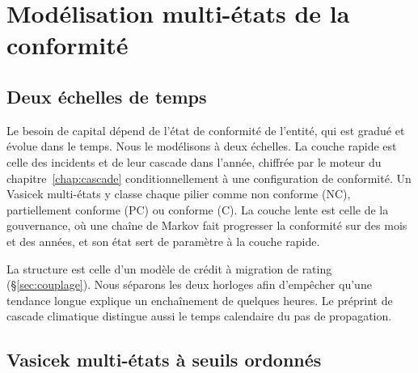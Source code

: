 
\chapter{Modélisation multi-états de la conformité}
\label{chap:multietats}


\section{Deux échelles de temps}

Le besoin de capital dépend de l'état de conformité de l'entité, qui est gradué et évolue dans le
temps. Nous le modélisons à deux échelles. La couche rapide est celle des incidents et de leur
cascade dans l'année, chiffrée par le moteur du chapitre~\ref{chap:cascade} conditionnellement à
une configuration de conformité. Un Vasicek multi-états y classe chaque pilier comme non
conforme (NC), partiellement conforme (PC) ou conforme (C). La couche lente est celle de la
gouvernance, où une chaîne de Markov fait progresser la conformité sur des mois et des années, et son
état sert de paramètre à la couche rapide.

La structure est celle d'un modèle de crédit à migration de rating (\S\ref{sec:couplage}). Nous
séparons les deux horloges afin d'empêcher qu'une tendance longue explique un enchaînement de
quelques heures. Le préprint de cascade climatique \citep{ccrn2026} distingue aussi
le temps calendaire du pas de propagation.

\section{Vasicek multi-états à seuils ordonnés}

